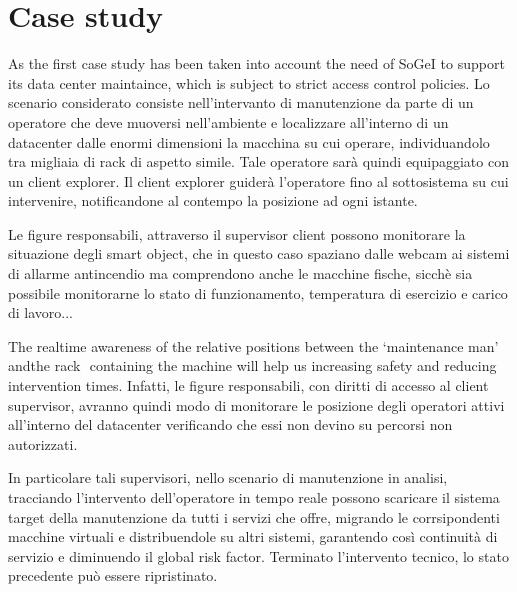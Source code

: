 \section{Case study}\label{use-case}

As the first case study has been taken into account the need of SoGeI to support its data center maintaince, which is subject to strict access control policies. 
Lo scenario considerato consiste nell'intervanto di manutenzione da parte di un operatore che deve muoversi nell'ambiente e localizzare all'interno di un datacenter dalle enormi dimensioni la macchina su cui operare, individuandolo tra migliaia di rack di aspetto simile. Tale operatore sarà quindi equipaggiato con un client explorer. Il client explorer guiderà l'operatore fino al sottosistema su cui intervenire, notificandone al contempo la posizione ad ogni istante.

Le figure responsabili, attraverso il supervisor client possono monitorare la situazione degli smart object, che in questo caso spaziano dalle webcam ai sistemi di allarme antincendio ma comprendono anche le macchine fische, sicchè sia possibile monitorarne lo stato di funzionamento, temperatura di esercizio e carico di lavoro...


The real­time awareness of the relative positions between
the ‘maintenance man' andthe rack ­ containing the machine­ will help us
increasing safety and reducing intervention times.
Infatti, le figure responsabili, con diritti di accesso al client supervisor, avranno quindi modo di monitorare le posizione degli operatori attivi all'interno del datacenter verificando che essi non devino su percorsi non autorizzati.

In particolare tali supervisori, nello scenario di manutenzione in analisi, tracciando l'intervento dell'operatore in tempo reale possono scaricare il sistema target della manutenzione da tutti i servizi che offre, migrando le corrsipondenti macchine virtuali e distribuendole su altri sistemi, garantendo così continuità di servizio e diminuendo il global risk factor. Terminato l'intervento tecnico, lo stato precedente può essere ripristinato. 






